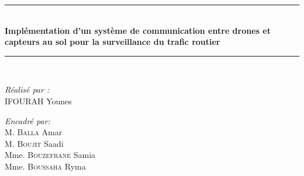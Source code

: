 {\begin{titlepage}
    \rule{\linewidth}{0.3mm} \\[0.4cm]
    {
    \Large \bfseries
    Implémentation d'un système de communication entre drones et capteurs au sol pour la surveillance du trafic routier\\
    }
    \rule{\linewidth}{0.3mm} \\[1cm]

    \vspace{10mm}

    \noindent
    \begin{minipage}{0.6\textwidth}
      \vspace{-7mm}
      \begin{flushleft} \large
        \emph{Réalisé par :}\\
        \textsc{IFOURAH} Younes \\
      \end{flushleft}
    \end{minipage}
    \begin{minipage}{0.35\textwidth}
      \begin{flushright} \large
        \begin{flushleft} \large
          \emph{Encadré par:} \\
          {
          M. \textsc{Balla} Amar\\[0.1cm]
          M. \textsc{Boujit} Saadi\\[0.1cm]
          Mme. \textsc{Bouzefrane} Samia\\[0.1cm]
          Mme. \textsc{Boussaha} Ryma\\[0.1cm]
          }
        \end{flushleft}
      \end{flushright}
    \end{minipage}\\[1cm]


\end{titlepage}}
